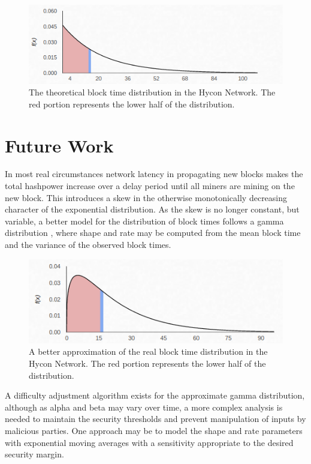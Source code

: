\documentclass[]{article}
\begin{document}
\begin{figure}[h]
	\centering
	\includegraphics[width=0.7\linewidth]{"./ideal hycon"}
	\caption{\footnotesize The theoretical block time distribution in the Hycon Network. The red portion represents the lower half of the distribution. \cite{GammaDistHycon}}
\end{figure}

\section{Future Work}
In most real circumstances network latency in propagating new blocks makes the total hashpower increase over a delay period until all miners are mining on the new block.  This introduces a skew in the otherwise monotonically decreasing character of the exponential distribution.  As the skew is no longer constant, but variable, a better model for the distribution of block times follows a gamma distribution \cite{GammaDistDefinition}, where shape and rate may be computed from the mean block time and the variance of the observed block times.  

\begin{figure}[h]
	\centering
	\includegraphics[width=0.7\linewidth]{"./real hycon"}
	\caption{\footnotesize A better approximation of the real block time distribution in the Hycon Network. The red portion represents the lower half of the distribution. \cite{GammaDistHycon}}
\end{figure}

A difficulty adjustment algorithm exists for the approximate gamma distribution, although as alpha and beta may vary over time, a more complex analysis is needed to maintain the security thresholds and prevent manipulation of inputs by malicious parties.  One approach may be to model the shape and rate parameters with exponential moving averages with a sensitivity appropriate to the desired security margin.  
\newline
\end{document}
